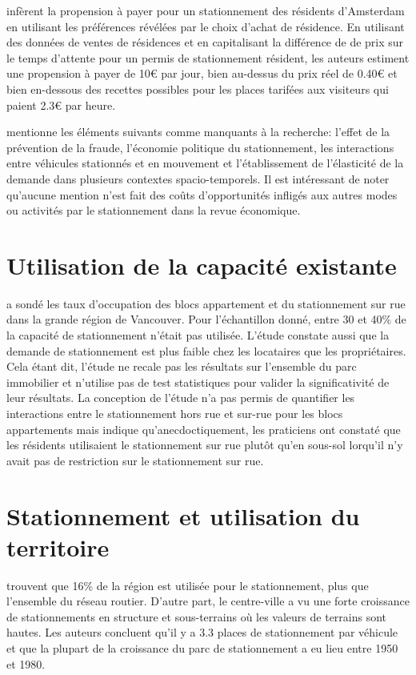 \textcite{vanOmmeren:RealPrice:2011} infèrent la propension à payer pour un stationnement des résidents d'Amsterdam en utilisant les préférences révélées par le choix d'achat de résidence. En utilisant des données de ventes de résidences et en capitalisant la différence de de prix sur le temps d'attente pour un permis de stationnement résident, les auteurs estiment une propension à payer de 10€ par jour, bien au-dessus du prix réel de 0.40€ et bien en-dessous des recettes possibles pour les places tarifées aux visiteurs qui paient 2.3€ par heure.

\textcite{Inci:ReviewEconomics:2015} mentionne les éléments suivants comme manquants à la recherche: l'effet de la prévention de la fraude, l'économie politique du stationnement, les interactions entre véhicules stationnés et en mouvement et l'établissement de l'élasticité de la demande dans plusieurs contextes spacio-temporels. Il est intéressant de noter qu'aucune mention n'est fait des coûts d'opportunités infligés aux autres modes ou activités par le stationnement dans la revue économique.

\section{Utilisation de la capacité existante}
\textcite{Translink:2018Regional:2019} a sondé les taux d'occupation des blocs appartement et du stationnement sur rue dans la grande région de Vancouver. Pour l'échantillon donné, entre 30 et 40\% de la capacité de stationnement n'était pas utilisée. L'étude constate aussi que la demande de stationnement est plus faible chez les locataires que les propriétaires. Cela étant dit, l'étude ne recale pas les résultats sur l'ensemble du parc immobilier et n'utilise pas de test statistiques pour valider la significativité de leur résultats. La conception de l'étude n'a pas permis de quantifier les interactions entre le stationnement hors rue et sur-rue pour les blocs appartements mais indique qu'anecdoctiquement, les praticiens ont constaté que les résidents utilisaient le stationnement sur rue plutôt qu'en sous-sol lorqu'il n'y avait pas de restriction sur le stationnement sur rue. 

\section{Stationnement et utilisation du territoire}
\textcite{Chester:ParkingInfrastructure:2015} trouvent que 16\% de la région est utilisée pour le stationnement, plus que l'ensemble du réseau routier. D'autre part, le centre-ville a vu une forte croissance de stationnements en structure et sous-terrains où les valeurs de terrains sont hautes. Les auteurs concluent qu'il y a 3.3 places de stationnement par véhicule et que la plupart de la croissance du parc de stationnement a eu lieu entre 1950 et 1980.\par

